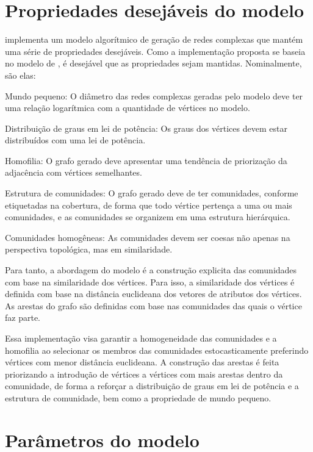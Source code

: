 \documentclass[notes.tex]{subfiles}
\begin{document}
\section{Propriedades desejáveis do modelo}

 implementa um modelo algorítmico de geração de redes complexas que mantém uma série de propriedades desejáveis.
Como a implementação proposta se baseia no modelo de , é desejável que as propriedades sejam mantidas.
Nominalmente, são elas:

\begin{alineas}
    \item Mundo pequeno: O diâmetro das redes complexas geradas pelo modelo deve ter uma relação logarítmica com a quantidade de vértices no modelo.
    \item Distribuição de graus em lei de potência: Os graus dos vértices devem estar distribuídos com uma lei de potência.
    \item Homofilia: O grafo gerado deve apresentar uma tendência de priorização da adjacência com vértices semelhantes.
    \item Estrutura de comunidades: O grafo gerado deve de ter comunidades, conforme etiquetadas na cobertura, de forma que todo vértice pertença a uma ou mais comunidades, e as comunidades se organizem em uma estrutura hierárquica.
    \item Comunidades homogêneas: As comunidades devem ser coesas não apenas na perspectiva topológica, mas em similaridade.
\end{alineas}

Para tanto, a abordagem do modelo é a construção explicita das comunidades com base na similaridade dos vértices.
Para isso, a similaridade dos vértices é definida com base na distância euclideana dos vetores de atributos dos vértices.
As arestas do grafo são definidas com base nas comunidades das quais o vértice faz parte.

Essa implementação visa garantir a homogeneidade das comunidades e a homofilia ao selecionar os membros das comunidades estocasticamente preferindo vértices com menor distância euclideana.
A construção das arestas é feita priorizando a introdução de vértices a vértices com mais arestas dentro da comunidade, de forma a reforçar a distribuição de graus em lei de potência e a estrutura de comunidade, bem como a propriedade de mundo pequeno.

\section{Parâmetros do modelo}
\end{document}
